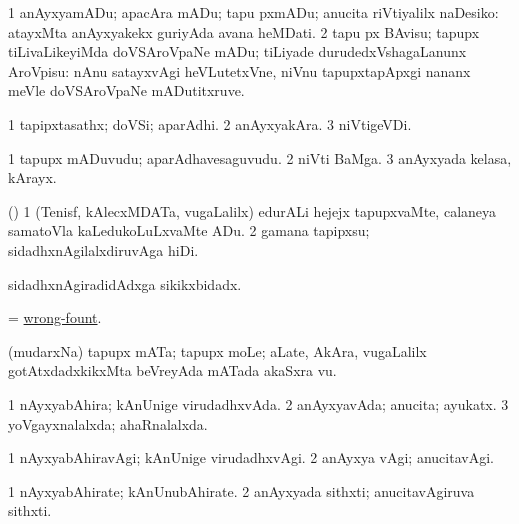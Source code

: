 \begin{center}
\bentry
{} 
\gl{\sakirx}
\expl{}
\bmng
\bnum
\num{1} anAyxyamADu; apacAra mADu; tapu pxmADu; anucita riVtiyalilx naDesiko:  atayxMta anAyxyakekx guriyAda avana heMDati. 
\num{2} tapu px BAvisu; tapupx tiLivaLikeyiMda doVSAroVpaNe mADu; tiLiyade durudedxVshagaLanunx AroVpisu:  nAnu satayxvAgi heVLutetxVne, niVnu tapupxtapApxgi nananx meVle doVSAroVpaNe mADutitxruve. 
\enum
\emng
\eentry

\bentry
{} 
\gl{\nA}
\expl{}
\bmng
\bnum
\num{1} tapipxtasathx; doVSi; aparAdhi. 
\num{2} anAyxyakAra. 
\num{3} niVtigeVDi. 
\enum
\emng
\eentry

\bentry
{} 
\gl{\nA}
\expl{}
\bmng
\bnum
\num{1} tapupx mADuvudu; aparAdhavesaguvudu. 
\num{2} niVti BaMga. 
\num{3} anAyxyada kelasa, kArayx. 
\enum
\emng
\eentry

\bentry
{} 
\gl{\sakirx}
\expl{}
\bmng
(\AmA) 
\bnum
\num{1} (Tenisf, kAlecxMDATa, \mo vugaLalilx) edurALi hejejx tapupxvaMte, calaneya samatoVla kaLedukoLuLxvaMte ADu. 
\num{2} gamana tapipxsu; sidadhxnAgilalxdiruvAga hiDi. 
\enum
\emng
\eentry

\bentry
{} 
\gl{\gu}
\expl{}
\bmng
sidadhxnAgiradidAdxga sikikxbidadx. 
\emng
\eentry

\bentry
{} 
\gl{\nA}
\expl{}
\bmng
= \hyperlink{wrong-fount}{wrong-fount}. 
\emng
\eentry

\bentry
{} 
\gl{\nA}
\expl{}
\bmng
(mudarxNa) tapupx mATa; tapupx moLe; aLate, AkAra, \mo vugaLalilx gotAtxdadxkikxMta beVreyAda mATada akaSxra \mo vu. 
\emng
\eentry

\bentry
{} 
\gl{\gu}
\expl{}
\bmng
\bnum
\num{1} nAyxyabAhira; kAnUnige virudadhxvAda. 
\num{2} anAyxyavAda; anucita; ayukatx. 
\num{3} yoVgayxnalalxda; ahaRnalalxda. 
\enum
\emng
\eentry

\bentry
{} 
\gl{\kirxvi}
\expl{}
\bmng
\bnum
\num{1} nAyxyabAhiravAgi; kAnUnige virudadhxvAgi. 
\num{2} anAyxya vAgi; anucitavAgi. 
\enum
\emng
\eentry

\bentry
{} 
\gl{\nA}
\expl{}
\bmng
\bnum
\num{1} nAyxyabAhirate; kAnUnubAhirate. 
\num{2} anAyxyada sithxti; anucitavAgiruva sithxti. 
\enum
\emng
\eentry


\end{center}
